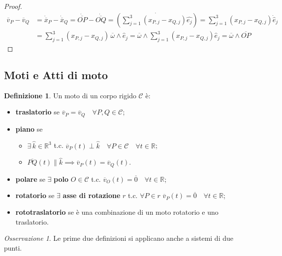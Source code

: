\documentclass{book}
\theoremstyle{plain}
\theoremstyle{plain}
\theoremstyle{plain}
\theoremstyle{plain}
\theoremstyle{plain}
\theoremstyle{definition}
\newtheorem{defi}{Definizione}[chapter]
\theoremstyle{remark}
\newtheorem*{oss}{Osservazione}
\theoremstyle{definition}
\begin{document}
\begin{proof}
\[
    \begin{split}
        \overline{v}_P-\overline{v}_Q&=\Dot{\overline{x}}_P-\Dot{\overline{x}}_Q=\Dot{\overline{OP}}-\Dot{\overline{OQ}}=\left(\Dot{\sum_{j=1}^3(x_{P,j}-x_{Q,j})\hat{e_j}}\right)=\sum_{j=1}^3(x_{P,j}-x_{Q,j})\Dot{\hat{e}}_j \\ &=\sum_{j=1}^3(x_{P,j}-x_{Q,j})\,\overline{\omega}\wedge\hat{e}_j=\overline{\omega}\wedge\sum_{j=1}^3(x_{P,j}-x_{Q,j})\hat{e}_j=\overline{\omega}\wedge\overline{OP}
    \end{split}
\]        
\end{proof}

\subsection{Moti e Atti di moto}

\begin{defi}
    Un moto di un corpo rigido $\mathcal{C}$ è:
    \begin{itemize}
        \item \textbf{traslatorio} se $\overline{v}_{P}=\overline{v}_{Q} \quad \forall P, Q \in \mathcal{C}$;
        \item \textbf{piano} se
        \begin{itemize}
            \item $\exists \, \hat{k} \in \mathbb{R}^{3}$ t.c. $\overline{v}_{P}(t) \perp \hat{k} \quad \forall P \in \mathcal{C} \quad \forall t \in \mathbb{R}$;
            \item $\overline{PQ}(t) \parallel \hat{k} \implies \overline{v}_{P}(t)=\overline{v}_{Q}(t)$.
        \end{itemize}
        \item \textbf{polare} se $\exists$ \textbf{polo} $O \in \mathcal{C}$ t.c. $\overline{v}_{O}(t)=\overline{0} \quad \forall t \in \mathbb{R}$;
        \item \textbf{rotatorio} se $\exists$ \textbf{asse di rotazione} $r$ t.c. $\forall P \in r$ $\overline{v}_{P}(t)=\overline{0} \quad \forall t \in \mathbb{R}$;
        \item \textbf{rototraslatorio} se è una combinazione di un moto rotatorio e uno traslatorio.
    \end{itemize}
\end{defi}

\begin{oss}
    Le prime due definizioni si applicano anche a sistemi di due punti.
\end{oss}
\end{document}

